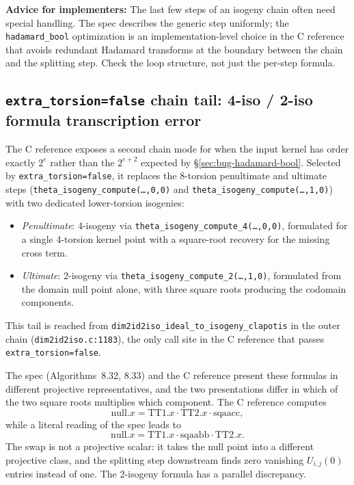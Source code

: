 \noindent
\textbf{Advice for implementers:} The last few steps of an isogeny chain often need
special handling.  The spec describes the generic step uniformly; the
\texttt{hadamard\_bool} optimization is an implementation-level choice
in the C reference that avoids redundant Hadamard transforms at the
boundary between the chain and the splitting step.  Check the loop
structure, not just the per-step formula.

\subsection{\texttt{extra\_torsion=false} chain tail: 4-iso / 2-iso
formula transcription error}
\label{sec:bug-no-extra-torsion-tail}

The C reference exposes a second chain mode for when the input
kernel has order exactly $2^e$ rather than the
$2^{e+2}$ expected by §\ref{sec:bug-hadamard-bool}.  Selected by
\texttt{extra\_torsion=false}, it replaces the 8-torsion penultimate
and ultimate steps (\texttt{theta\_isogeny\_compute(\dots,0,0)} and
\texttt{theta\_isogeny\_compute(\dots,1,0)}) with two dedicated
lower-torsion isogenies:
\begin{itemize}
  \item \emph{Penultimate}: 4-isogeny via
    \texttt{theta\_isogeny\_compute\_4(\dots,0,0)}, formulated for a
    single 4-torsion kernel point with a square-root recovery for
    the missing cross term.
  \item \emph{Ultimate}: 2-isogeny via
    \texttt{theta\_isogeny\_compute\_2(\dots,1,0)}, formulated from
    the domain null point alone, with three square roots producing
    the codomain components.
\end{itemize}
This tail is reached from
\texttt{dim2id2iso\_ideal\_to\_isogeny\_clapotis} in the outer chain
(\texttt{dim2id2iso.c:1183}), the only call site in the C reference
that passes \texttt{extra\_torsion=false}.

The spec (Algorithms~8.32, 8.33) and the C reference present
these formulas in different projective representatives, and the
two presentations differ in which of the two square roots
multiplies which component.  The C reference computes
\[
  \mathrm{null}.x = \mathrm{TT1}.x \cdot \mathrm{TT2}.x \cdot \mathrm{sqaacc},
\]
while a literal reading of the spec leads to
\[
  \mathrm{null}.x = \mathrm{TT1}.x \cdot \mathrm{sqaabb} \cdot \mathrm{TT2}.x.
\]
The swap is not a projective scalar: it takes the null point into
a different projective class, and the splitting step downstream
finds zero vanishing $U_{i,j}(0)$ entries instead of one.  The
2-isogeny formula has a parallel discrepancy.

